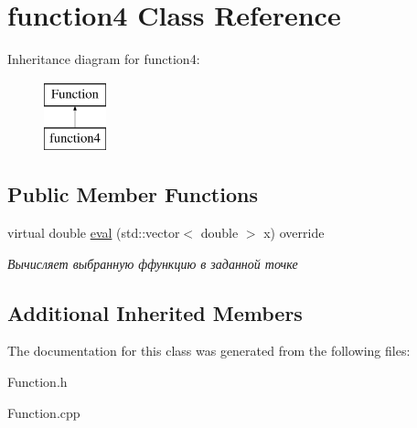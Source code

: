 \hypertarget{classfunction4}{}\section{function4 Class Reference}
\label{classfunction4}
Inheritance diagram for function4\+:\begin{figure}[H]
\begin{center}
\leavevmode
\includegraphics[height=2.000000cm]{classfunction4}
\end{center}
\end{figure}
\subsection*{Public Member Functions}
\begin{DoxyCompactItemize}
\item 
\mbox{\label{classfunction4_ab463eeb605f2598995f6d4e42e91fe45}} 
virtual double \mbox{\hyperlink{classfunction4_ab463eeb605f2598995f6d4e42e91fe45}{eval}} (std\+::vector$<$ double $>$ x) override
\begin{DoxyCompactList}\small\item\em Вычисляет выбранную ффункцию в заданной точке \end{DoxyCompactList}\end{DoxyCompactItemize}
\subsection*{Additional Inherited Members}


The documentation for this class was generated from the following files\+:\begin{DoxyCompactItemize}
\item 
Function.\+h\item 
Function.\+cpp\end{DoxyCompactItemize}
